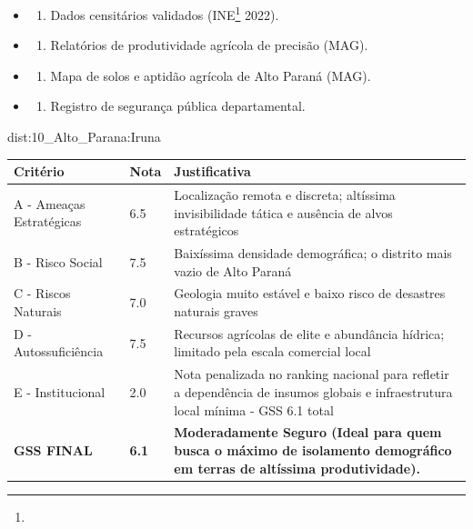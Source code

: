 {\begin{itemize}
\tightlist
\item
  \begin{enumerate}
  \def\labelenumi{\arabic{enumi})}
  \tightlist
  \item
    Dados censitários validados (INE\footnote{\fineINE} 2022).
  \end{enumerate}
\item
  \begin{enumerate}
  \def\labelenumi{\arabic{enumi})}
  \setcounter{enumi}{1}
  \tightlist
  \item
    Relatórios de produtividade agrícola de precisão (MAG).
  \end{enumerate}
\item
  \begin{enumerate}
  \def\labelenumi{\arabic{enumi})}
  \setcounter{enumi}{2}
  \tightlist
  \item
    Mapa de solos e aptidão agrícola de Alto Paraná (MAG).
  \end{enumerate}
\item
  \begin{enumerate}
  \def\labelenumi{\arabic{enumi})}
  \setcounter{enumi}{3}
  \tightlist
  \item
    Registro de segurança pública departamental.
  \end{enumerate}
\end{itemize}}{dist:10_Alto_Parana:Iruna}
\begin{table}[ht!]
\small \begin{tabular}{p{3.0cm}p{0.8cm}p{6.0cm}} \toprule
\textbf{Critério} & \textbf{Nota} & \textbf{Justificativa} \\ \midrule
A - Ameaças Estratégicas & 6.5 & Localização remota e discreta; altíssima invisibilidade tática e ausência de alvos estratégicos \\
B - Risco Social & 7.5 & Baixíssima densidade demográfica; o distrito mais vazio de Alto Paraná \\
C - Riscos Naturais & 7.0 & Geologia muito estável e baixo risco de desastres naturais graves \\
D - Autossuficiência & 7.5 & Recursos agrícolas de elite e abundância hídrica; limitado pela escala comercial local \\
E - Institucional & 2.0 & Nota penalizada no ranking nacional para refletir a dependência de insumos globais e infraestrutura local mínima - GSS 6.1 total \\
\midrule \textbf{GSS FINAL} & \textbf{6.1} & \textbf{Moderadamente Seguro (Ideal para quem busca o máximo de isolamento demográfico em terras de altíssima produtividade).} \\ \bottomrule \end{tabular}
\end{table}
